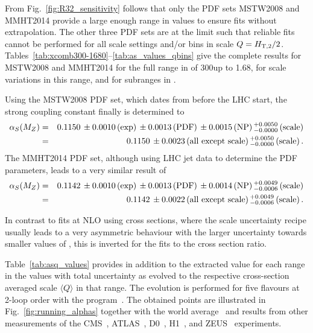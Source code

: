 From Fig.~\ref{fig:R32_sensitivity} follows that only the PDF sets MSTW2008 and MMHT2014 provide a large enough range in \alpsmz values to ensure fits without extrapolation. The other three PDF sets are at the limit such that reliable fits cannot be performed for all scale settings and/or bins in scale $Q=H_{\mathrm{T,2}}/2$. Tables~\ref{tab:xcomb300-1680}--\ref{tab:as_values_qbins} give the complete results for MSTW2008 and MMHT2014 for the full range in \httwo of 300\GeV up to 1.68\TeV, for scale variations in this range, and for subranges in \httwo.

Using the MSTW2008 PDF set, which dates from before the LHC start, the strong coupling constant finally is determined to
%
\begin{eqnarray*}
  \alpha_S(M_Z) &=& 0.1150\,\pm0.0010\,\textrm{(exp)}\,\pm0.0013\,\textrm{(PDF)}\,\pm0.0015\,\textrm{(NP)}\,^{+0.0050}_{-0.0000}\,\textrm{(scale)}\\
  &=& 0.1150\,\pm0.0023\,\textrm{(all except scale)}\,^{+0.0050}_{-0.0000}\,\textrm{(scale)}\,.
\end{eqnarray*}
%
The MMHT2014 PDF set, although using LHC jet data to determine the PDF
parameters, leads to a very similar result of
\begin{eqnarray*}
  \alpha_S(M_Z) &=& 0.1142\,\pm0.0010\,\textrm{(exp)}\,\pm0.0013\,\textrm{(PDF)}\,\pm0.0014\,\textrm{(NP)}\,^{+0.0049}_{-0.0006}\,\textrm{(scale)}\\
  &=& 0.1142\,\pm0.0022\,\textrm{(all except scale)}\,^{+0.0049}_{-0.0006}\,\textrm{(scale)}\,.
\end{eqnarray*}

In contrast to fits at NLO using cross sections, where the scale uncertainty recipe usually leads to a very asymmetric behaviour with the larger uncertainty towards smaller values of \alpsmz, this is inverted for the fits to the cross section ratio.

Table~\ref{tab:asq_values} provides in addition to the extracted \alpsmz value for each range in \httwo the \alpsq values with total uncertainty as evolved to the respective cross-section averaged scale $\langle{}Q\rangle$ in that range. The evolution is performed for five flavours at 2-loop order with the \RunDec program~\cite{Chetyrkin:2000yt, Schmidt:2012az}. The obtained \alpsq points are illustrated in Fig.~\ref{fig:running_alphas} together with the world average~\cite{Patrignani:2016xqp} and results from other measurements of the CMS~\cite{Chatrchyan:2013txa, Chatrchyan:2013haa, Khachatryan:2014waa, CMS:2014mna, Khachatryan:2016mlc}, ATLAS~\cite{ATLAS:2015yaa}, D0~\cite{Abazov:2009nc, Abazov:2012lua}, H1~\cite{Andreev:2014wwa, Andreev:2016tgi}, and ZEUS~\cite{Abramowicz:2012jz} experiments.

